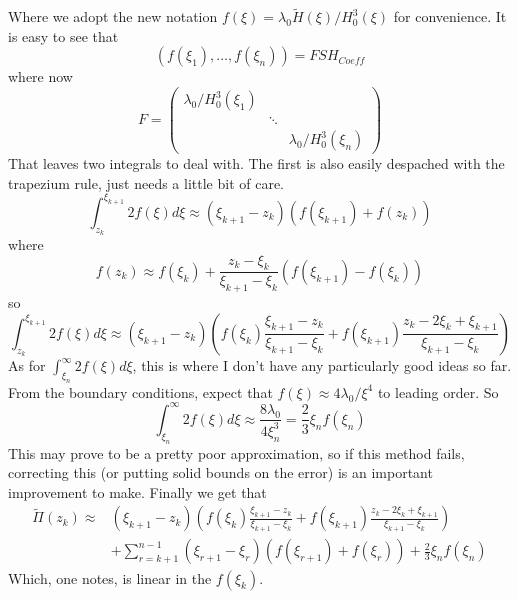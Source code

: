 \documentclass{article}
\begin{document}
Where we adopt the new notation $f(\xi) = \lambda_0 \tilde{H}(\xi)/H_0^3(\xi)$
for convenience. It is easy to see that 
\[ (f(\xi_1), \dots , f(\xi_n)) = FSH_{Coeff} \] 
where now 
\[ F = \left( \begin{array}{ccc}
\lambda_0/H_0^3(\xi_1) \\
& \ddots \\
& & \lambda_0/H_0^3(\xi_n) \end{array} \right) \]
That leaves two integrals to deal with. The first is also easily despached
with the trapezium rule, just needs a little bit of care.
\[ \int_{z_k}^{\xi_{k+1}} 2f(\xi) d\xi \approx (\xi_{k+1} - z_k)(f(\xi_{k+1})
+ f(z_k) )\]
where
\[f(z_k) \approx f(\xi_k) + \frac{z_k - \xi_k}{\xi_{k+1}-\xi_k} (f(\xi_{k+1})
-f(\xi_k) ) \] 
so
\[ \int_{z_k}^{\xi_{k+1}} 2f(\xi) d\xi \approx (\xi_{k+1} - z_k)
\left( f(\xi_k) \frac{\xi_{k+1}-z_k}{\xi_{k+1}-\xi_k} + f(\xi_{k+1})
\frac{z_k - 2 \xi_k +\xi_{k+1}}{\xi_{k+1}-\xi_k} \right)
\]
As for $ \int_{\xi_n}^{\infty} 2f(\xi) d\xi$, this is where I don't have any
particularly good ideas so far. From the boundary conditions, expect that
$f(\xi) \approx 4\lambda_0 /\xi^4$ to leading order. So
\[ \int_{\xi_n}^{\infty} 2f(\xi) d\xi \approx \frac{8\lambda_0}{4\xi_n^3}
= \frac{2}{3} \xi_n f(\xi_n)\]
This may prove to be a pretty poor approximation, so if this method fails, 
correcting this (or putting solid bounds on the error) is an important 
improvement to make. Finally we get that
\begin{align*}
\tilde{\Pi}(z_k) \approx &(\xi_{k+1} - z_k)
\left( f(\xi_k) \frac{\xi_{k+1}-z_k}{\xi_{k+1}-\xi_k} + f(\xi_{k+1})
\frac{z_k - 2 \xi_k +\xi_{k+1}}{\xi_{k+1}-\xi_k} \right) \\
&+ \sum_{r = k+1}^{n-1} (\xi_{r+1} - \xi_{r})(f(\xi_{r+1})+f(\xi_r)) + 
\frac{2}{3}\xi_n f(\xi_n)
\end{align*}
Which, one notes, is linear in the $f(\xi_k)$.
%
%
%
%
%
%
\end{document}
